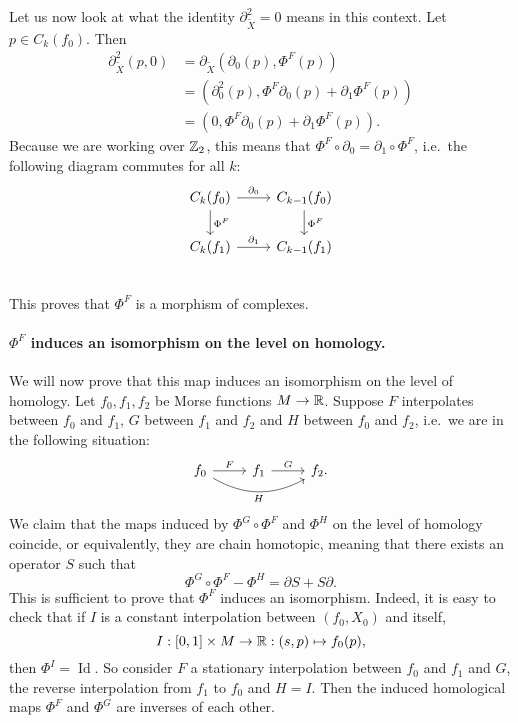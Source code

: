 \begin{myproof}
Let us now look at what the identity $\partial_{\tilde{X}}^2 = 0$ means in this context. Let $p \in C_k(f_0)$.
Then
\begin{align*}
    \partial_{\tilde{X}}^2 (p, 0) &= \partial_{\tilde{X}}(\partial_{0}(p),  \Phi^{F}(p))\\
                                                      &= (\partial_0^2(p), \Phi^{F}\partial_0(p)+ \partial_1 \Phi^{F}(p))\\
                                                    &= (0, \Phi^{F}\partial_0(p)+ \partial_1 \Phi^{F}(p))
.\end{align*} 
Because we are working over $\mathbb{Z}_2$, this means that $\Phi^{F}  \circ  \partial_0 = \partial_1  \circ  \Phi^{F}$, i.e.\ the following diagram commutes for all $k$:
\[
    \begin{tikzcd}
        C_k(f_0) \arrow[d, "\Phi^{F}"]\arrow[r, "\partial_0"] &C_{k-1}(f_0) \arrow[d, "\Phi^{F}"]\\
        C_k(f_1) \arrow[r, "\partial_1"] &C_{k-1}(f_1)\\
    \end{tikzcd}
\]
This proves that $\Phi^{F}$ is a morphism of complexes.

\paragraph{$\Phi^{F}$ induces an isomorphism on the level on homology.}

We will now prove that this map induces an isomorphism on the level of homology.
Let $f_0, f_1, f_2$ be Morse functions $M \to  \mathbb{R}$.
Suppose $F$ interpolates between $f_0$ and $f_1$,
$G$ between $f_1$ and $f_2$ and $H$ between $f_0$ and $f_2$, i.e.\ we are in the following situation:
\[
    \begin{tikzcd}
        f_0 \arrow[rr, "H"', bend right] \arrow[r, "F"] &f_1 \arrow[r, "G"] &f_2.
    \end{tikzcd}
\]
We claim that the maps induced by $\Phi^{G} \circ \Phi^{F}$ and $\Phi^{H}$ on the level of homology coincide, or equivalently, they are chain homotopic, meaning that there exists an operator $S$ such that
 \[
\Phi^{G}  \circ  \Phi^{F} - \Phi^{H} = \partial S + S \partial
.\] 
This is sufficient to prove that $\Phi^{F}$ induces an isomorphism.
Indeed, it is easy to check that if $I$ is a constant interpolation between  $(f_0, X_0)$ and itself, 
\[
    I: [0,1] \times M \to  \mathbb{R}: (s, p) \mapsto f_0(p),
\] 
then $\Phi^{I} = \operatorname{Id}$.
So consider $F$ a stationary interpolation between $f_0$ and $f_1$ and $G$, the reverse interpolation from $f_1$ to $f_0$ and $H = I$. Then the induced homological maps $\Phi^{F}$ and $\Phi^{G}$ are inverses of each other.


\end{myproof}

